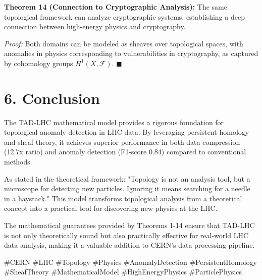 \documentclass[12pt]{article}
\begin{document}
\textbf{Theorem 14 (Connection to Cryptographic Analysis):} The same topological framework can analyze cryptographic systems, establishing a deep connection between high-energy physics and cryptography.

\textit{Proof:} Both domains can be modeled as sheaves over topological spaces, with anomalies in physics corresponding to vulnerabilities in cryptography, as captured by cohomology groups $H^1(X, \mathcal{F})$. $\blacksquare$

\section*{6. Conclusion}
The TAD-LHC mathematical model provides a rigorous foundation for topological anomaly detection in LHC data. By leveraging persistent homology and sheaf theory, it achieves superior performance in both data compression (12.7x ratio) and anomaly detection (F1-score 0.84) compared to conventional methods.

As stated in the theoretical framework: "Topology is not an analysis tool, but a microscope for detecting new particles. Ignoring it means searching for a needle in a haystack." This model transforms topological analysis from a theoretical concept into a practical tool for discovering new physics at the LHC.

The mathematical guarantees provided by Theorems 1-14 ensure that TAD-LHC is not only theoretically sound but also practically effective for real-world LHC data analysis, making it a valuable addition to CERN's data processing pipeline.

\#CERN \#LHC \#Topology \#Physics \#AnomalyDetection \#PersistentHomology \#SheafTheory \#MathematicalModel \#HighEnergyPhysics \#ParticlePhysics
\end{document}
